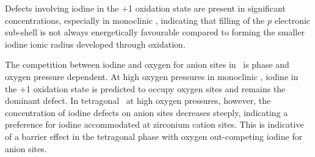 Defects involving iodine in the +1 oxidation state are present in significant concentrations, especially in monoclinic \zirconia , indicating that filling of the $p$ electronic sub-shell is not always energetically favourable compared to forming the smaller iodine ionic radius developed through oxidation. 

The competition between iodine and oxygen for anion sites in \zirconia\ is phase and oxygen pressure dependent. At high oxygen pressures in monoclinic \zirconia , iodine in the +1 oxidation state is predicted to occupy oxygen sites and remains the dominant defect. In tetragonal \zirconia\ at high oxygen pressures, however, the concentration of iodine defects on anion sites decreases steeply, indicating a preference for iodine accommodated at zirconium cation sites. This is indicative of a barrier effect in the tetragonal phase with oxygen out-competing iodine for anion sites.
